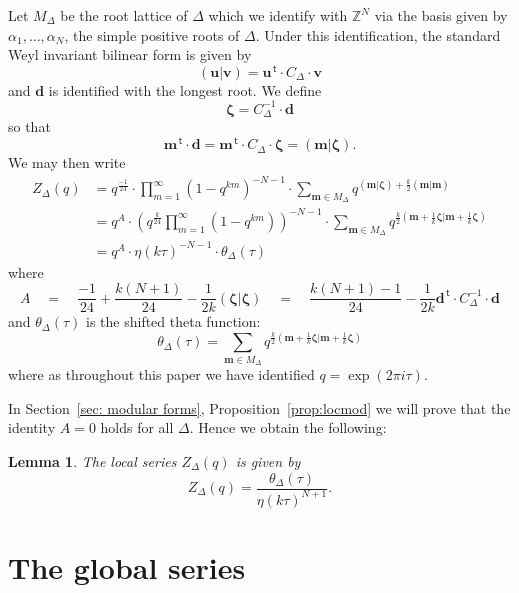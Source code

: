 \documentclass{article}
\newtheorem{lemma}[theorem]{Lemma}
\theoremstyle{definition}
\newcommand{\ZZ} {{\mathbb Z}}		%
\renewcommand{\top}{\,\mathsf{t}}
\newcommand{\mvec}{\bm{m}}
\newcommand{\zetavec}{\bm{\zeta }}
\newcommand{\dvec}{\bm{d }}
\newcommand{\uvec}{\bm{u }}
\newcommand{\vvec}{\bm{v }}
\begin{document}
Let $M_{\Delta}$ be the root lattice of $\Delta$ which we identify
with $\ZZ^{N}$ via the basis given by $\alpha_{1},\dotsc ,\alpha_{N}$,
the simple positive roots of $\Delta$. Under this identification, the
standard Weyl invariant bilinear form is given by
\[
(\uvec |\vvec ) = \uvec^{\top}\cdot C_{\Delta}\cdot \vvec 
\]
and $\dvec$ is identified with the longest root. 
We define
\[
\zetavec = C_{\Delta}^{-1} \cdot \dvec 
\]
so that 
\[
\mvec^{\top}\cdot \dvec = \mvec^{\top}\cdot C_{\Delta} \cdot \zetavec
= (\mvec |\zetavec ).
\]
We may then write
\begin{align*}
Z_{\Delta}(q)& = q^{\frac{-1}{24}}\cdot
\prod_{m=1}^{\infty}(1-q^{km})^{-N-1}\cdot \sum _{\mvec \in M_{\Delta}} q^{(\mvec |\zetavec )+\frac{k}{2}(\mvec |\mvec)}\\
&= q^{A} \cdot \left(q^{\frac{k}{24}}\prod_{m=1}^{\infty}(1-q^{km})
\right)^{-N-1} \cdot \sum_{\mvec \in M_{\Delta}} q^{\frac{k}{2}\left(\mvec +\frac{1}{k}\zetavec |\mvec +\frac{1}{k}\zetavec  \right)}\\
& = q^{A}\cdot  \eta (k\tau )^{-N-1}\cdot  \theta_{\Delta} (\tau )
\end{align*}
where 
\[
A \quad = \quad \frac{-1}{24} + \frac{k(N+1)}{24} - \frac{1}{2k}(\zetavec
|\zetavec ) \quad = \quad \frac{k(N+1)-1}{24} - \frac{1}{2k}\dvec^{\top}\cdot
C_{\Delta}^{-1} \cdot \dvec 
\]
and $\theta_{\Delta}(\tau )$ is the shifted theta function:
\[
\theta_{\Delta}(\tau ) = \sum_{\mvec \in M_{\Delta}} q^{\frac{k}{2}\left(\mvec +\frac{1}{k}\zetavec |\mvec +\frac{1}{k}\zetavec  \right)}
\]
where as throughout this paper we have identified $q=\exp\left(2\pi i\tau  \right)$.

In Section~\ref{sec: modular forms}, Proposition~\ref{prop:locmod} we will prove that the identity $A=0$ holds
for all $\Delta$. Hence we obtain the following:
\begin{lemma}\label{lem: local series as theta/eta} The local series
$Z_{\Delta}(q)$ is given by
\[
Z_{\Delta}(q) = \frac{\theta_{\Delta}(\tau )}{\eta (k\tau )^{N+1}}. 
\]
\end{lemma}



\section{The global series}\label{sec: the global series}
\end{document}
